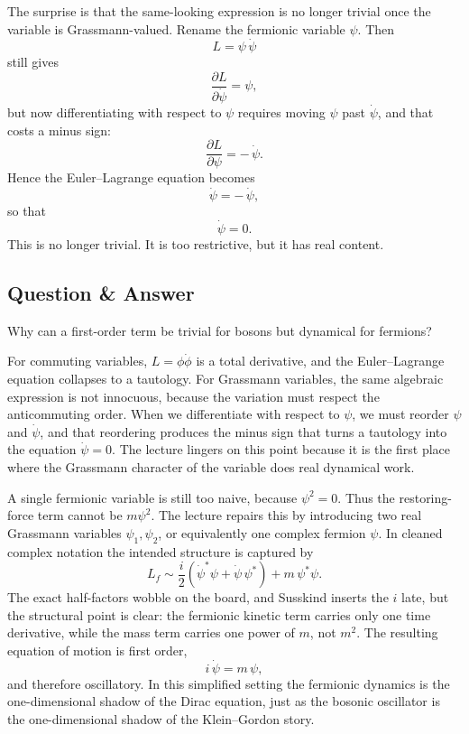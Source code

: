 The surprise is that the same-looking expression is no longer trivial once the variable is Grassmann-valued. Rename the fermionic variable \(\psi\). Then
\begin{equation}
L = \psi\,\dot\psi
\end{equation}
still gives
\begin{equation}
\frac{\partial L}{\partial \dot\psi} = \psi,
\end{equation}
but now differentiating with respect to \(\psi\) requires moving \(\psi\) past \(\dot\psi\), and that costs a minus sign:
\begin{equation}
\frac{\partial L}{\partial \psi} = -\,\dot\psi.
\end{equation}
Hence the Euler--Lagrange equation becomes
\begin{equation}
\dot\psi = -\,\dot\psi,
\end{equation}
so that
\begin{equation}
\dot\psi = 0.
\end{equation}
This is no longer trivial. It is too restrictive, but it has real content.

\subsection{Question \& Answer}

Why can a first-order term be trivial for bosons but dynamical for fermions?

For commuting variables, \(L=\phi\dot\phi\) is a total derivative, and the Euler--Lagrange equation collapses to a tautology. For Grassmann variables, the same algebraic expression is not innocuous, because the variation must respect the anticommuting order. When we differentiate with respect to \(\psi\), we must reorder \(\psi\) and \(\dot\psi\), and that reordering produces the minus sign that turns a tautology into the equation \(\dot\psi=0\). The lecture lingers on this point because it is the first place where the Grassmann character of the variable does real dynamical work.

A single fermionic variable is still too naive, because \(\psi^2=0\). Thus the restoring-force term cannot be \(m\psi^2\). The lecture repairs this by introducing two real Grassmann variables \(\psi_1,\psi_2\), or equivalently one complex fermion \(\psi\). In cleaned complex notation the intended structure is captured by
\begin{equation}
L_f \sim \frac{i}{2}\left(\dot\psi^\ast \psi + \dot\psi\,\psi^\ast\right) + m\,\psi^\ast\psi.
\end{equation}
The exact half-factors wobble on the board, and Susskind inserts the \(i\) late, but the structural point is clear: the fermionic kinetic term carries only one time derivative, while the mass term carries one power of \(m\), not \(m^2\). The resulting equation of motion is first order,
\begin{equation}
i\,\dot\psi = m\,\psi,
\end{equation}
and therefore oscillatory. In this simplified setting the fermionic dynamics is the one-dimensional shadow of the Dirac equation, just as the bosonic oscillator is the one-dimensional shadow of the Klein--Gordon story.

